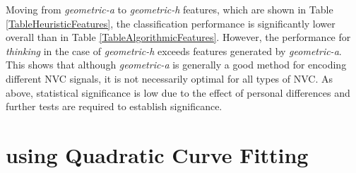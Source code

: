 
Moving from \textit{geometric-a} to \textit{geometric-h} features, which are shown in Table \ref{TableHeuristicFeatures}, the classification performance is significantly lower overall than in Table \ref{TableAlgorithmicFeatures}. However, the performance for \textit{thinking} in the case of \textit{geometric-h} exceeds features generated by \textit{geometric-a}. This shows that although \textit{geometric-a} is generally a good method for encoding different \ac{NVC} signals, it is not necessarily optimal for all types of \ac{NVC}. As above, statistical significance is low due to the effect of personal differences and further tests are required to establish significance.


\section{\temporalFeatPluralCap{ }using Quadratic Curve Fitting}
\label{SectionTemporalFeatures}


